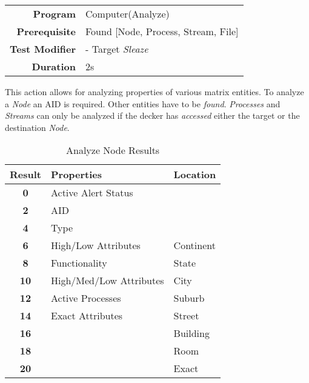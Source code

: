 \begin{tabular}{rl}
    \textbf{Program}       & Computer(Analyze)                   \\
    \textbf{Prerequisite}  & Found [Node, Process, Stream, File] \\
    \textbf{Test Modifier} & - Target \emph{Sleaze}              \\
    \textbf{Duration}      & 2s                                  \\
\end{tabular}

\hfill

This action allows for analyzing properties of various matrix entities. To analyze a \emph{Node}
an AID is required. Other entities have to be \emph{found}. \emph{Processes} and \emph{Streams}
can only be analyzed if the decker has \emph{accessed} either the target or the destination
\emph{Node}.

\begin{table}[htb]
    \caption[Analyze Node Results]{Analyze Node Results}
    \label{tab:analyze results}
    \centering
    \begin{tabular}{cll}
        \toprule
        \textbf{Result} & \textbf{Properties}     & \textbf{Location} \\
        \midrule
        \textbf{0}      & Active Alert Status     &                   \\
        \textbf{2}      & AID                     &                   \\
        \textbf{4}      & Type                    &                   \\
        \textbf{6}      & High/Low Attributes     & Continent         \\
        \textbf{8}      & Functionality           & State             \\
        \textbf{10}     & High/Med/Low Attributes & City              \\
        \textbf{12}     & Active Processes        & Suburb            \\
        \textbf{14}     & Exact Attributes        & Street            \\
        \textbf{16}     &                         & Building          \\
        \textbf{18}     &                         & Room              \\
        \textbf{20}     &                         & Exact             \\
        \bottomrule
    \end{tabular}
\end{table}


